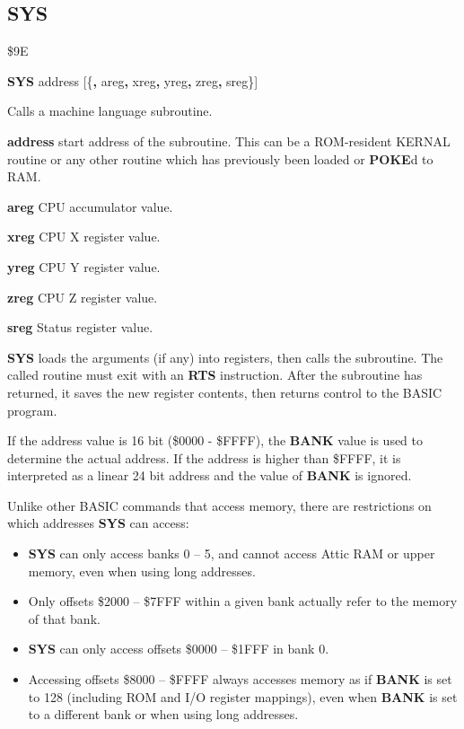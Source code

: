 \subsection{SYS}
\begin{description}[leftmargin=2cm,style=nextline]
\item [Token:] \$9E
\item [Format:] {\bf SYS} address [\{{\bf,} areg{\bf,} xreg{\bf,} yreg{\bf,}
		zreg{\bf,} sreg\}]
\item [Usage:] Calls a machine language subroutine.

               {\bf address} start address of the subroutine.
               This can be a ROM-resident KERNAL routine
               or any other routine which has previously been loaded or {\bf POKE}d
               to RAM.

               {\bf areg} CPU accumulator value.

               {\bf xreg} CPU X register value.

               {\bf yreg} CPU Y register value.

               {\bf zreg} CPU Z register value.

               {\bf sreg} Status register value.

               {\bf SYS} loads the arguments (if any) into registers, then calls the subroutine.
               The called routine must exit with
               an {\bf RTS} instruction.
               After the subroutine has returned,
               it saves the new register contents,
               then returns control to the BASIC program.

               If the address value is 16 bit (\$0000 - \$FFFF), the
               {\bf BANK} value is used to determine the actual address.
               If the address is higher than \$FFFF, it is interpreted as a
               linear 24 bit address and the value of {\bf BANK} is ignored.

               Unlike other BASIC commands that access memory, there are
               restrictions on which addresses {\bf SYS} can access:
               \begin{itemize}
               \item {\bf SYS} can
               only access banks 0 -- 5, and cannot access Attic RAM or upper
               memory, even when using long addresses.
               \item Only offsets \$2000 -- \$7FFF within a given bank actually
               refer to the memory of that bank.
               \item {\bf SYS} can only access offsets \$0000 -- \$1FFF in
               bank 0.
               \item Accessing offsets \$8000 -- \$FFFF always accesses
               memory as if {\bf BANK} is set to 128 (including ROM and I/O
               register mappings), even when {\bf BANK} is set to a different
               bank or when using long addresses.
               \end{itemize}


\end{description}
